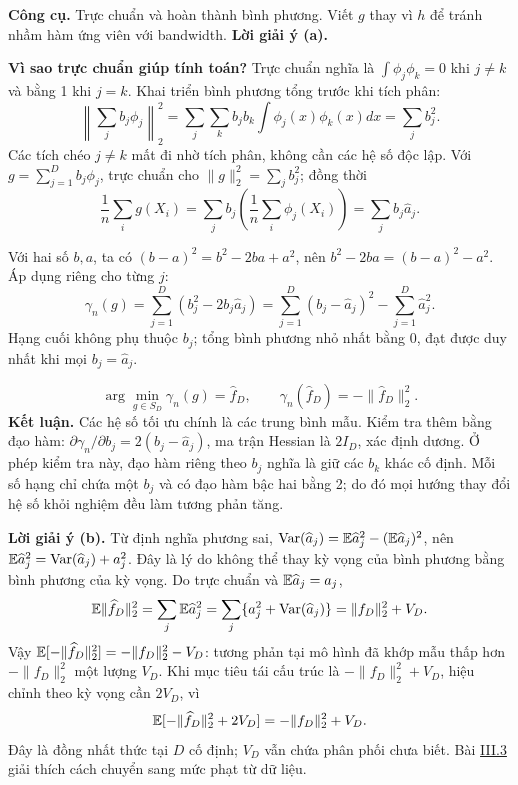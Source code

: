 \textbf{Công cụ.} Trực chuẩn và hoàn thành bình phương.
Viết $g$ thay vì $h$ để tránh nhầm hàm ứng viên với bandwidth.
\textbf{Lời giải ý (a).}

\textbf{Vì sao trực chuẩn giúp tính toán?} Trực chuẩn nghĩa là
$\int\phi_j\phi_k=0$ khi $j\ne k$ và bằng 1 khi $j=k$.
Khai triển bình phương tổng trước khi tích phân:
\[
\left\|\sum_jb_j\phi_j\right\|_2^2
=\sum_j\sum_k b_jb_k\int\phi_j(x)\phi_k(x)dx
=\sum_jb_j^2.
\]
Các tích chéo $j\ne k$ mất đi nhờ tích phân, không cần các hệ số độc lập.
Với $g=\sum_{j=1}^D b_j\phi_j$, trực chuẩn cho $\|g\|_2^2=\sum_jb_j^2$;
đồng thời
\[
\frac1n\sum_i g(X_i)=\sum_j b_j\left(\frac1n\sum_i\phi_j(X_i)\right)
=\sum_jb_j\widehat a_j.
\]

Với hai số $b,a$, ta có $(b-a)^2=b^2-2ba+a^2$,
nên $b^2-2ba=(b-a)^2-a^2$. Áp dụng riêng cho từng $j$:
\[
\gamma_n(g)=\sum_{j=1}^D(b_j^2-2b_j\widehat a_j)
=\sum_{j=1}^D(b_j-\widehat a_j)^2-\sum_{j=1}^D\widehat a_j^2.
\]
Hạng cuối không phụ thuộc $b_j$; tổng bình phương nhỏ nhất bằng 0,
đạt được duy nhất khi mọi $b_j=\widehat a_j$.

\[
\boxed{\arg\min_{g\in S_D}\gamma_n(g)=\widehat f_D,\qquad
\gamma_n(\widehat f_D)=-\|\widehat f_D\|_2^2.}
\]
\textbf{Kết luận.} Các hệ số tối ưu chính là các trung bình mẫu.
Kiểm tra thêm bằng đạo hàm: $\partial\gamma_n/\partial b_j=2(b_j-\widehat a_j)$,
ma trận Hessian là $2I_D$, xác định dương.
Ở phép kiểm tra này, đạo hàm riêng theo $b_j$ nghĩa là giữ các $b_k$ khác cố định.
Mỗi số hạng chỉ chứa một $b_j$ và có đạo hàm bậc hai bằng 2;
do đó mọi hướng thay đổi hệ số khỏi nghiệm đều làm tương phản tăng.

\textbf{Lời giải ý (b).}
Từ định nghĩa phương sai,
$\operatorname{Var}(\widehat a_j)=\mathbb E\widehat a_j^2-(\mathbb E\widehat a_j)^2$,
nên $\mathbb E\widehat a_j^2=\operatorname{Var}(\widehat a_j)+a_j^2$.
Đây là lý do không thể thay kỳ vọng của bình phương bằng bình phương của kỳ vọng.
Do trực chuẩn và $\mathbb E\widehat a_j=a_j$,
\[
\mathbb E\|\widehat f_D\|_2^2=\sum_j\mathbb E\widehat a_j^2
=\sum_j\{a_j^2+\operatorname{Var}(\widehat a_j)\}
=\|f_D\|_2^2+V_D.
\]
Vậy $\mathbb E[-\|\widehat f_D\|_2^2]=-\|f_D\|_2^2-V_D$:
tương phản tại mô hình đã khớp mẫu thấp hơn $-\|f_D\|_2^2$ một lượng $V_D$.
Khi mục tiêu tái cấu trúc là $-\|f_D\|_2^2+V_D$, hiệu chỉnh theo kỳ vọng cần
$2V_D$, vì
\[
\mathbb E[-\|\widehat f_D\|_2^2+2V_D]=-\|f_D\|_2^2+V_D.
\]
Đây là đồng nhất thức tại $D$ cố định; $V_D$ vẫn chứa phân phối chưa biết.
Bài \hyperref[ot45:oracle]{III.3} giải thích cách chuyển sang mức phạt từ dữ liệu.

